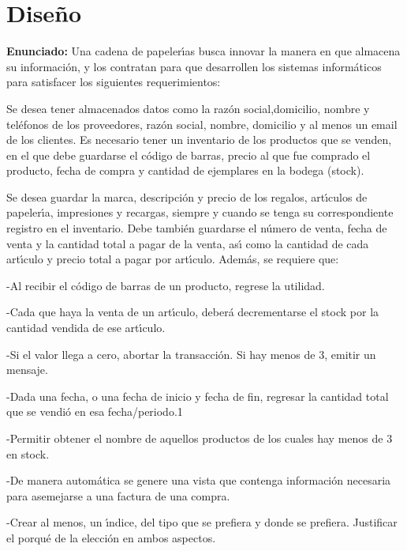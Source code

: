 \documentclass[30pt,fleqn]{article}
\begin{document}

\newpage
\section{Diseño}
\vspace{5mm} %

\textbf{Enunciado:}
\vspace{6mm} %
Una cadena de papelerı́as busca innovar la manera en que almacena su información, y los contratan para que desarrollen los sistemas informáticos para satisfacer los siguientes requerimientos:

Se desea tener almacenados datos como la razón social,domicilio, nombre y teléfonos de los proveedores, razón social, nombre, domicilio y al menos un email de los clientes. Es necesario tener un inventario de los productos que se venden, en el que debe guardarse el código de barras, precio al que fue comprado el producto, fecha de compra y cantidad de ejemplares en la bodega (stock).

Se desea guardar la marca, descripción y precio de los regalos, artı́culos de
papelerı́a, impresiones y recargas, siempre y cuando se tenga su correspondiente registro en el inventario. Debe también guardarse el número de venta, fecha de venta y la cantidad total a pagar de la venta, ası́ como la cantidad de cada artı́culo y precio total a pagar por artı́culo.
Además, se requiere que:

-Al recibir el código de barras de un producto, regrese la utilidad.

-Cada que haya la venta de un artı́culo, deberá decrementarse el stock por
la cantidad vendida de ese artı́culo.

-Si el valor llega a cero, abortar la transacción. Si hay menos de 3, emitir un mensaje.

-Dada una fecha, o una fecha de inicio y fecha de fin, regresar la cantidad
total que se vendió en esa fecha/periodo.1

-Permitir obtener el nombre de aquellos productos de los cuales hay menos
de 3 en stock.

-De manera automática se genere una vista que contenga información necesaria para asemejarse a una factura de una compra.

-Crear al menos, un ı́ndice, del tipo que se prefiera y donde se prefiera.
Justificar el porqué de la elección en ambos aspectos.
\end{document}

